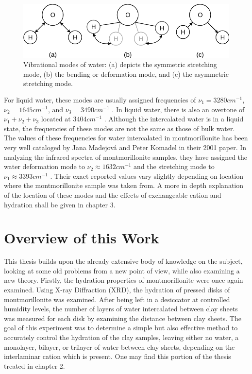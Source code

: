 \begin{figure}
	\centering
	\includegraphics[scale=0.55]{images/water_vibrations.png}
	\caption{Vibrational modes of water: (a) depicts the symmetric stretching mode, (b) the bending or deformation mode, and (c) the asymmetric stretching mode.}
	\label{fig:water_vibrations}
\end{figure}

For liquid water, these modes are usually assigned frequencies of $\nu_1=3280cm^{-1}$, $\nu_2=1645cm^{-1}$, and $\nu_3=3490cm^{-1}$ \cite{eisenberg2005structure}. In liquid water, there is also an overtone of $\nu_1+\nu_2+\nu_3$ located at $3404cm^{-1}$ \cite{max2009isotope}. Although the intercalated water is in a liquid state, the frequencies of these modes are not the same as those of bulk water. The values of these frequencies for water intercalated in montmorillonite has been very well cataloged by Jana Madejová and Peter Komadel in their 2001 paper. In analyzing the infrared spectra of montmorillonite samples, they have assigned the water deformation mode to $\nu_2\approx 1632cm^{-1}$ and the stretching mode to $\nu_1\approx 3393cm^{-1}$ \cite{madejova2001baseline}. Their exact reported values vary slightly depending on location where the montmorillonite sample was taken from. A more in depth explanation of the location of these modes and the effects of exchangeable cation and hydration shall be given in chapter 3.

\section{Overview of this Work}
This thesis builds upon the already extensive body of knowledge on the subject, looking at some old problems from a new point of view, while also examining a new theory. Firstly, the hydration properties of montmorillonite were once again examined. Using X-ray Diffraction (XRD), the hydration of pressed disks of montmorillonite was examined. After being left in a desiccator at controlled humidity levels, the number of layers of water intercalated between clay sheets was measured for each disk by examining the distance between clay sheets. The goal of this experiment was to determine a simple but also effective method to accurately control the hydration of the clay samples, leaving either no water, a monolayer, bilayer, or trilayer of water between clay sheets, depending on the interlaminar cation which is present. One may find this portion of the thesis treated in chapter 2.


